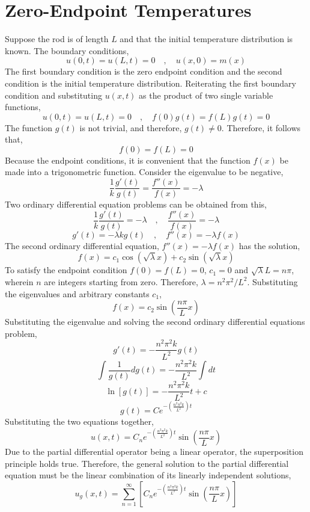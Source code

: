 \section{Zero-Endpoint Temperatures}
\begin{comment} 
\end{comment}
Suppose the rod is of length $L$ and that the initial temperature distribution is known. The boundary conditions,
$$u(0,t) = u(L,t) = 0\quad,\quad u(x,0) = m(x)$$The first boundary condition is the zero endpoint condition and the second condition is the initial temperature distribution. Reiterating the first boundary condition and substituting $u(x,t)$ as the product of two single variable functions,
$$u(0,t) = u(L,t) = 0\quad,\quad f(0)g(t) = f(L)g(t) = 0$$
The function $g(t)$ is not trivial, and therefore, $g(t) \neq 0$. Therefore, it follows that,
$$f(0) = f(L) = 0$$Because the endpoint conditions, it is convenient that the function $f(x)$ be made into a trigonometric function. Consider the eigenvalue to be negative,
$$\frac{1}{k}\frac{g'(t)}{g(t)} = \frac{f''(x)}{f(x)} = -\lambda$$
Two ordinary differential equation problems can be obtained from this,
$$\frac{1}{k}\frac{g'(t)}{g(t)} = -\lambda \quad,\quad \frac{f''(x)}{f(x)} = -\lambda$$
$$g'(t) = -\lambda kg(t) \quad,\quad f''(x) = -\lambda f(x)$$                               
The second ordinary differential equation, $\displaystyle{f''(x) = -\lambda f(x)}$ has the solution,
$$f(x) = c_1\cos\left(\sqrt{\lambda}x\right) + c_2\sin\left(\sqrt{\lambda}x\right)$$To satisfy the endpoint condition $\displaystyle{f(0) = f(L) = 0}$, $c_1 = 0$ and $\sqrt{\lambda}L = n\pi$, wherein $n$ are integers starting from zero. Therefore, $\lambda = n^2\pi^2/L^2$. Substituting the eigenvalues and arbitrary constants $c_1$,
$$f(x) = c_2\sin\left(\frac{n\pi}{L} x\right)$$
Substituting the eigenvalue and solving the second ordinary differential equations problem,
$$g'(t) = -\frac{n^2\pi^2k}{L^2}g(t)$$
$$\int\frac{1}{g(t)}dg(t) = -\frac{n^2\pi^2k}{L^2}\int dt$$
$$\ln[g(t)] = -\frac{n^2\pi^2k}{L^2}t + c$$
$$g(t) = Ce^{\displaystyle{-\left(\frac{n^2\pi^2k}{L^2}\right)t}}$$
Substituting the two equations together,
$$u(x,t) = C_ne^{\displaystyle{-\left(\frac{n^2\pi^2k}{L^2}\right)t}}\sin\left(\frac{n\pi}{L} x\right)$$
Due to the partial differential operator being a linear operator, the superposition principle holds true. Therefore, the general solution to the partial differential equation must be the linear combination of its linearly independent solutions,
$$u_g(x,t) = \sum^{\infty}_{n=1}\left[C_ne^{\displaystyle{-\left(\frac{n^2\pi^2k}{L^2}\right)t}}\sin\left(\frac{n\pi}{L} x\right)\right]$$
